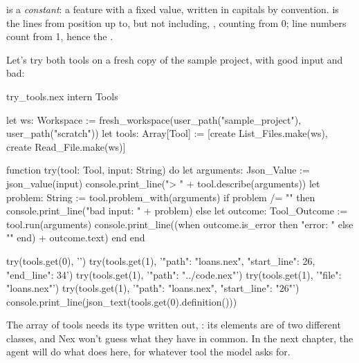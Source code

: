  is a \emph{constant}: a feature with a fixed value,
written in capitals by convention.  is the lines
from position  up to, but not including, , counting from 0;
line numbers count from 1, hence the .

Let's try both tools on a fresh copy of the sample project, with good input
and bad:

\begin{tryit}{try_tools.nex}
intern Tools

let ws: Workspace := fresh_workspace(user_path("sample_project"), user_path("scratch"))
let tools: Array[Tool] := [create List_Files.make(ws), create Read_File.make(ws)]

function try(tool: Tool, input: String) do
  let arguments: Json_Value := json_value(input)
  console.print_line("> " + tool.describe(arguments))
  let problem: String := tool.problem_with(arguments)
  if problem /= "" then
    console.print_line("bad input: " + problem)
  else
    let outcome: Tool_Outcome := tool.run(arguments)
    console.print_line((when outcome.is_error then "error: " else "" end) + outcome.text)
  end
end

try(tools.get(0), '{}')
try(tools.get(1), '{"path": "loans.nex", "start_line": 26, "end_line": 34}')
try(tools.get(1), '{"path": "../code.nex"}')
try(tools.get(1), '{"file": "loans.nex"}')
try(tools.get(1), '{"path": "loans.nex", "start_line": "26"}')
console.print_line(json_text(tools.get(0).definition()))
\end{tryit}

The array of tools needs its type written out, : its
elements are of two different classes, and Nex won't guess what they have
in common. In the next chapter, the agent will do what  does
here, for whatever tool the model asks for.

